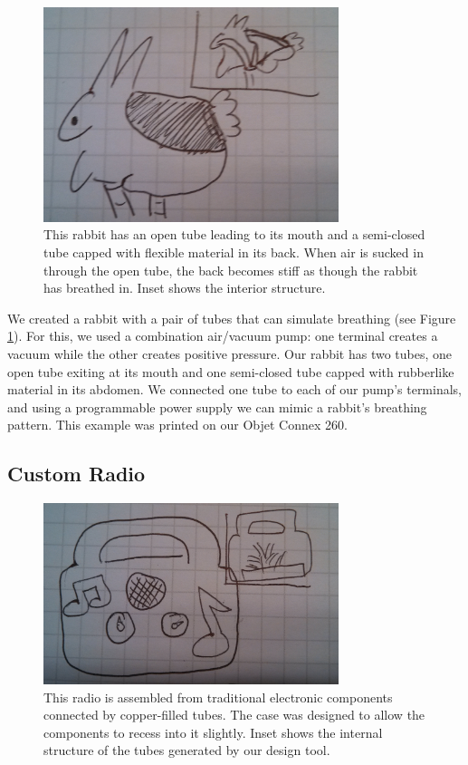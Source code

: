 \begin{figure}[h]
\centering
    \includegraphics[width=3.4in]{figures/placeholder/bunny.jpg}
\caption{This rabbit has an open tube leading to its mouth and a semi-closed tube capped with flexible material in its back.  When air is sucked in through the open tube, the back becomes stiff as though the rabbit has breathed in.  Inset shows the interior structure.}
\label{fig:breathe}
\end{figure}

We created a rabbit with a pair of tubes that can simulate breathing (see Figure \ref{fig:breathe}).  For this, we used a combination air/vacuum pump: one terminal creates a vacuum while the other creates positive pressure.  Our rabbit has two tubes, one open tube exiting at its mouth and one semi-closed tube capped with rubberlike material in its abdomen.  We connected one tube to each of our pump's terminals, and using a programmable power supply we can mimic a rabbit's breathing pattern.  This example was printed on our Objet Connex 260. 

\subsection{Custom Radio}

\begin{figure}[h]
\centering
    \includegraphics[width=3.4in]{figures/placeholder/radio.jpg}
\caption{This radio is assembled from traditional electronic components connected by copper-filled tubes.  The case was designed to allow the components to recess into it slightly.  Inset shows the internal structure of the tubes generated by our design tool.}
\label{fig:radio}
\end{figure}

